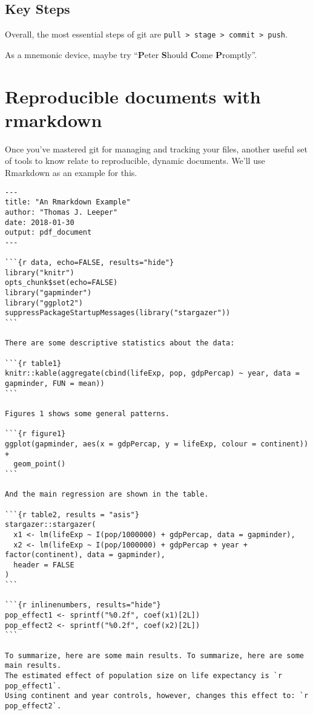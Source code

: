 \documentclass[12pt, a4paper]{article}
\begin{document}
\subsection*{Key Steps}

Overall, the most essential steps of git are \texttt{pull > stage > commit > push}.

\noindent As a mnemonic device, maybe try ``\textbf{P}eter \textbf{S}hould \textbf{C}ome \textbf{P}romptly''.


\clearpage
\section{Reproducible documents with rmarkdown}

Once you've mastered git for managing and tracking your files, another useful set of tools to know relate to reproducible, dynamic documents. We'll use Rmarkdown as an example for this.

\footnotesize 
\begin{verbatim}
---
title: "An Rmarkdown Example"
author: "Thomas J. Leeper"
date: 2018-01-30
output: pdf_document
---

```{r data, echo=FALSE, results="hide"}
library("knitr")
opts_chunk$set(echo=FALSE)
library("gapminder")
library("ggplot2")
suppressPackageStartupMessages(library("stargazer"))
```

There are some descriptive statistics about the data:

```{r table1}
knitr::kable(aggregate(cbind(lifeExp, pop, gdpPercap) ~ year, data = gapminder, FUN = mean))
```

Figures 1 shows some general patterns.

```{r figure1}
ggplot(gapminder, aes(x = gdpPercap, y = lifeExp, colour = continent)) + 
  geom_point()
```
  
And the main regression are shown in the table.

```{r table2, results = "asis"}
stargazer::stargazer(
  x1 <- lm(lifeExp ~ I(pop/1000000) + gdpPercap, data = gapminder),
  x2 <- lm(lifeExp ~ I(pop/1000000) + gdpPercap + year + factor(continent), data = gapminder),
  header = FALSE
)
```

```{r inlinenumbers, results="hide"}
pop_effect1 <- sprintf("%0.2f", coef(x1)[2L])
pop_effect2 <- sprintf("%0.2f", coef(x2)[2L])
```

To summarize, here are some main results. To summarize, here are some main results. 
The estimated effect of population size on life expectancy is `r pop_effect1`.
Using continent and year controls, however, changes this effect to: `r pop_effect2`.
\end{verbatim}
\end{document}
